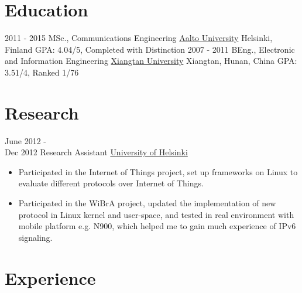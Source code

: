 \documentclass[letterpaper]{twentysecondcv} %
\begin{document}
\makeprofile %

\section{Education}

\begin{twenty} %
	\twentyitem
    	{2011 - 2015}
        {MSc., Communications Engineering}
        {\href{http://www.aalto.fi/en/}{Aalto University}}
        {Helsinki, Finland}
        {GPA: 4.04/5, Completed with Distinction}
	\twentyitem
    	{2007 - 2011}
        {BEng.,  Electronic and Information Engineering}
        {\href{http://www.xtu.edu.cn/english/}{Xiangtan University}}
        {Xiangtan, Hunan, China}
        {GPA: 3.51/4, Ranked 1/76}
\end{twenty}


\section{Research}
\begin{twenty}
	\twentyitem
    	{June 2012 - \\Dec 2012}
        {Research Assistant}
        {\href{https://www.helsinki.fi/en}{University of Helsinki}}
        {}
        {
        {\begin{itemize}
        \item Participated in the Internet of Things project, set up	 frameworks on Linux to evaluate different protocols over Internet of Things.
        \item Participated in the WiBrA project,	 updated	 the	 implementation of new protocol in Linux kernel and	 user-space, and tested in real environment	 with mobile platform e.g. N900, which helped	 me to gain much experience of IPv6 signaling.
    \end{itemize}}
        }
\end{twenty}


\section{Experience}
\end{document}
